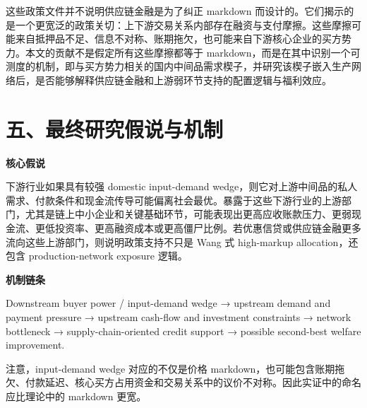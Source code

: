 \documentclass[
  12pt,
]{ctexart}
\begin{document}
这些政策文件并不说明供应链金融是为了纠正 markdown 而设计的。它们揭示的是一个更宽泛的政策关切：上下游交易关系内部存在融资与支付摩擦。这些摩擦可能来自抵押品不足、信息不对称、账期拖欠，也可能来自下游核心企业的买方势力。本文的贡献不是假定所有这些摩擦都等于 markdown，而是在其中识别一个可测度的机制，即与买方势力相关的国内中间品需求楔子，并研究该楔子嵌入生产网络后，是否能够解释供应链金融和上游弱环节支持的配置逻辑与福利效应。

\section{五、最终研究假说与机制}\label{ux4e94ux6700ux7ec8ux7814ux7a76ux5047ux8bf4ux4e0eux673aux5236}

\textbf{核心假说}

下游行业如果具有较强 domestic input-demand wedge，则它对上游中间品的私人需求、付款条件和现金流传导可能偏离社会最优。暴露于这些下游行业的上游部门，尤其是链上中小企业和关键基础环节，可能表现出更高应收账款压力、更弱现金流、更低投资率、更高融资成本或更高僵尸比例。若优惠信贷或供应链金融更多流向这些上游部门，则说明政策支持不只是 Wang 式 high-markup allocation，还包含 production-network exposure 逻辑。

\textbf{机制链条}

Downstream buyer power / input-demand wedge → upstream demand and payment pressure → upstream cash-flow and investment constraints → network bottleneck → supply-chain-oriented credit support → possible second-best welfare improvement.

注意，input-demand wedge 对应的不仅是价格 markdown，也可能包含账期拖欠、付款延迟、核心买方占用资金和交易关系中的议价不对称。因此实证中的命名应比理论中的 markdown 更宽。
\end{document}
